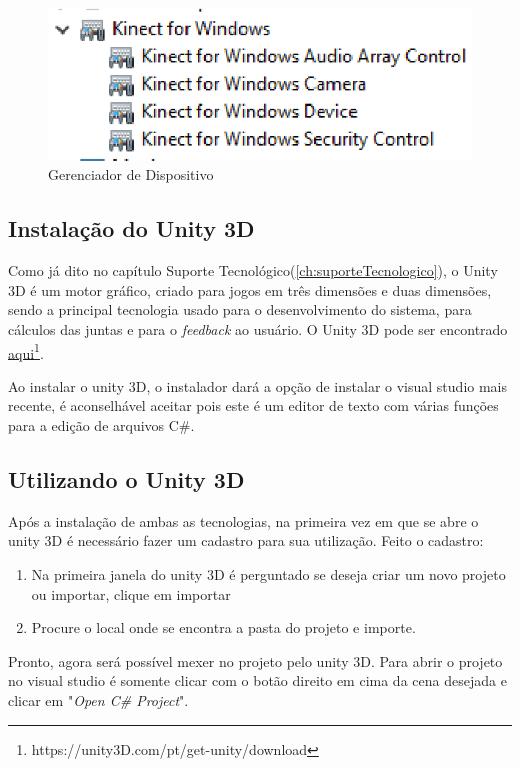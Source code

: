 \begin{figure}[H]
\centering
\includegraphics [keepaspectratio=true,scale=0.60]{figuras/gerenciadorDispositivo.eps}

\caption{Gerenciador de Dispositivo}
\label{gerenciadorDispositivo}
\end{figure}

\subsection{Instalação do Unity 3D}\label{sub:instalacaoUnity}
  Como já dito no capítulo Suporte Tecnológico(\ref{ch:suporteTecnologico}), o Unity 3D é um motor gráfico, criado para jogos em três dimensões e duas dimensões,
sendo a principal tecnologia usado para o desenvolvimento do sistema, para cálculos das juntas e para o \textit{feedback} ao usuário.
O Unity 3D pode ser encontrado \href{https://unity3D.com/pt/get-unity/download}{aqui}\footnote{https://unity3D.com/pt/get-unity/download}.

  Ao instalar o unity 3D, o instalador dará
a opção de instalar o visual studio mais recente, é aconselhável aceitar pois este é um editor de texto com várias funções para a edição
de arquivos C\#.

\subsection{Utilizando o Unity 3D}
  Após a instalação de ambas as tecnologias, na primeira vez em que se abre o unity 3D é necessário fazer um cadastro para sua utilização. Feito
o cadastro:
\begin{enumerate}
  \item Na primeira janela do unity 3D é perguntado se deseja criar um novo projeto ou importar, clique em importar
  \item Procure o local onde se encontra a pasta do projeto e importe.
\end{enumerate}

  Pronto, agora será possível mexer no projeto pelo unity 3D. Para abrir o projeto no visual studio é somente clicar com o botão direito em cima
da cena desejada e clicar em "\textit{Open C\# Project}".

